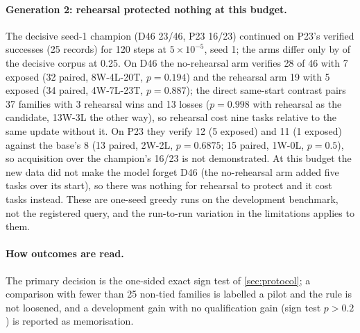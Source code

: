 \paragraph{Generation 2: rehearsal protected nothing at this budget.} The decisive seed-1 champion (D46 23/46, P23 16/23) continued on P23's verified successes (25 records) for 120 steps at $5\times10^{-5}$, seed 1; the arms differ only by  of the decisive corpus at 0.25. On D46 the no-rehearsal arm verifies 28 of 46 with 7 exposed (32 paired, 8W-4L-20T, $p=0.194$) and the rehearsal arm 19 with 5 exposed (34 paired, 4W-7L-23T, $p=0.887$); the direct same-start contrast pairs 37 families with 3 rehearsal wins and 13 losses ($p=0.998$ with rehearsal as the candidate, 13W-3L the other way), so rehearsal cost nine tasks relative to the same update without it. On P23 they verify 12 (5 exposed) and 11 (1 exposed) against the base's 8 (13 paired, 2W-2L, $p=0.6875$; 15 paired, 1W-0L, $p=0.5$), so acquisition over the champion's 16/23 is not demonstrated. At this budget the new data did not make the model forget D46 (the no-rehearsal arm added five tasks over its start), so there was nothing for rehearsal to protect and it cost tasks instead. These are one-seed greedy runs on the development benchmark, not the registered query, and the run-to-run variation in the limitations applies to them.

\begin{table}[tbp]
\centering\small

\caption{Development probes on D46 (pilot, not the registered confirmatory query): paired families among the 46, wins and losses from the adapter's side, and the exact one-sided sign test computed from them. A row is a probe, not a confirmatory result.}\label{tab:pilots-d46}
\end{table}

\paragraph{How outcomes are read.} The primary decision is the one-sided exact sign test of
\cref{sec:protocol}; a comparison with fewer than 25 non-tied families is labelled a pilot and the
rule is not loosened, and a development gain with no qualification gain (sign test $p>0.2$) is
reported as memorisation.
